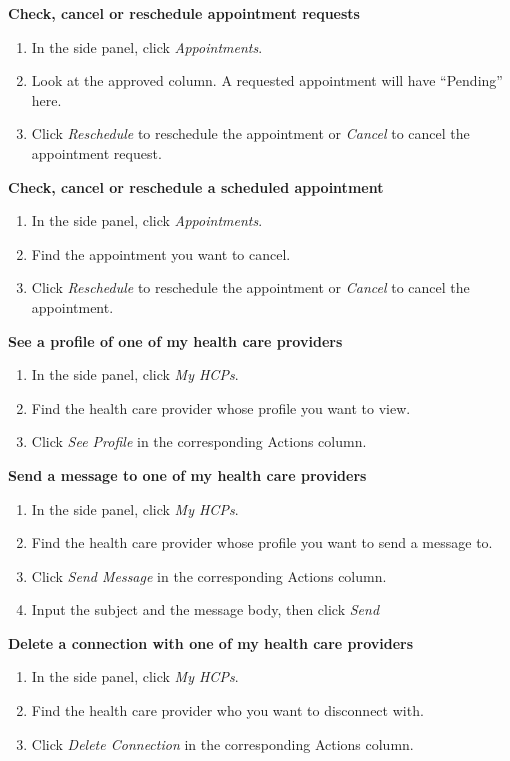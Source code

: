 \textbf{Check, cancel or reschedule appointment requests}
\begin{enumerate}
\item In the side panel, click \textit{ Appointments}.
\item Look at the approved column. A requested appointment will have ``Pending'' here.
\item Click \textit{Reschedule} to reschedule the appointment or \textit{Cancel} to cancel the appointment request.
\end{enumerate}
\textbf{Check, cancel or reschedule a scheduled appointment}
\begin{enumerate}
\item In the side panel, click \textit{Appointments}.
\item Find the appointment you want to cancel. 
\item Click \textit{Reschedule} to reschedule the appointment or \textit{Cancel} to cancel the appointment.
\end{enumerate}
\textbf{See a profile of one of my health care providers}
\begin{enumerate}
\item In the side panel, click \textit{My HCPs}.
\item Find the health care provider whose profile you want to view.
\item Click \textit{See Profile} in the corresponding Actions column.
\end{enumerate}
\textbf{Send a message to one of my health care providers}
\begin{enumerate}
\item In the side panel, click \textit{My HCPs}.
\item Find the health care provider whose profile you want to send a message to.
\item Click \textit{Send Message} in the corresponding Actions column.
\item Input the subject and the message body, then click \textit{Send}
\end{enumerate}
\textbf{Delete a connection with one of my health care providers}
\begin{enumerate}
\item In the side panel, click \textit{My HCPs}.
\item Find the health care provider who you want to disconnect with.
\item Click \textit{Delete Connection} in the corresponding Actions column.
\end{enumerate}
